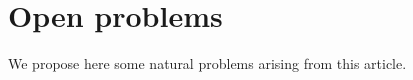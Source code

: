 \documentclass{amsart}
\newtheorem{Proposition}[Theorem]{Proposition}
\newtheorem{Problem}{Problem}
\theoremstyle{definition}
\newcommand{\mo}{\mathcal{O}}
\begin{document}

\section{Open problems}\label{se:openproblems}

We propose here some natural problems arising from this article.

\end{document}

